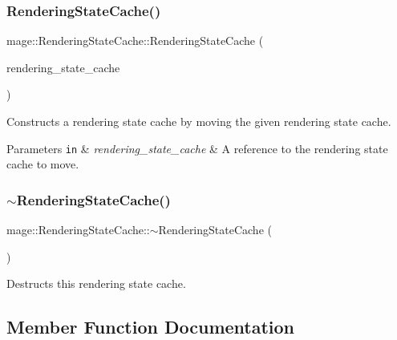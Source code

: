 \subsubsection{\texorpdfstring{Rendering\+State\+Cache()}{RenderingStateCache()}\hspace{0.1cm}{\footnotesize\ttfamily [3/3]}}
{\footnotesize\ttfamily mage\+::\+Rendering\+State\+Cache\+::\+Rendering\+State\+Cache (\begin{DoxyParamCaption}\item[{\hyperlink{structmage_1_1_rendering_state_cache}{Rendering\+State\+Cache} \&\&}]{rendering\+\_\+state\+\_\+cache }\end{DoxyParamCaption})\hspace{0.3cm}{\ttfamily [default]}}

Constructs a rendering state cache by moving the given rendering state cache.


\begin{DoxyParams}[1]{Parameters}
\mbox{\tt in}  & {\em rendering\+\_\+state\+\_\+cache} & A reference to the rendering state cache to move. \\
\hline
\end{DoxyParams}
\hypertarget{structmage_1_1_rendering_state_cache_ac727351db3d929df122327887edc3668}{}\label{structmage_1_1_rendering_state_cache_ac727351db3d929df122327887edc3668} 
\subsubsection{\texorpdfstring{$\sim$\+Rendering\+State\+Cache()}{~RenderingStateCache()}}
{\footnotesize\ttfamily mage\+::\+Rendering\+State\+Cache\+::$\sim$\+Rendering\+State\+Cache (\begin{DoxyParamCaption}{ }\end{DoxyParamCaption})\hspace{0.3cm}{\ttfamily [default]}}

Destructs this rendering state cache. 

\subsection{Member Function Documentation}
\hypertarget{structmage_1_1_rendering_state_cache_aa5ebc4c062269a9e1d4dbd5c50b09fb9}{}\label{structmage_1_1_rendering_state_cache_aa5ebc4c062269a9e1d4dbd5c50b09fb9} 
